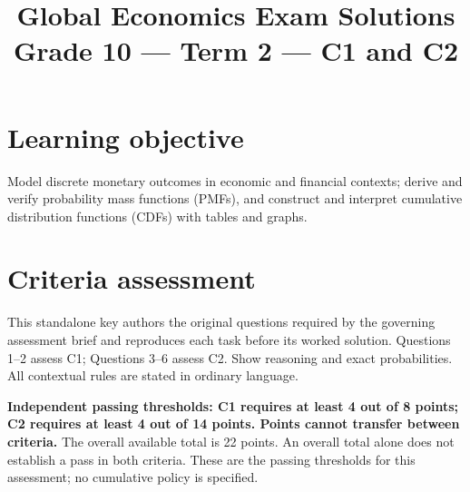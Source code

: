 \makeatletter
{}
\makeatother

\linespread{0.98}
\setlength{\parskip}{2pt}
\renewcommand{\arraystretch}{1.0}
\setlength{\emergencystretch}{2em}
\title{Global Economics Exam Solutions\\Grade 10 --- Term 2 --- C1 and C2}
\author{}
\date{}
\makeatletter
\renewcommand{\@maketitle}{\begin{center}{\Large\bfseries\@title\par}\end{center}}
\renewcommand\subsection{\@startsection{subsection}{2}{\z@}{-1.4ex plus -.3ex}{.7ex}{\normalfont\large\bfseries}}
\makeatother
{}

\maketitle
\small
\setcounter{tocdepth}{1}
\label{toc}
\tableofcontents
\section*{Learning objective}
Model discrete monetary outcomes in economic and financial contexts; derive and verify probability mass functions (PMFs), and construct and interpret cumulative distribution functions (CDFs) with tables and graphs.
\section*{Criteria assessment}
This standalone key authors the original questions required by the governing assessment brief and reproduces each task before its worked solution. Questions 1--2 assess C1; Questions 3--6 assess C2. Show reasoning and exact probabilities. All contextual rules are stated in ordinary language.

\textbf{Independent passing thresholds: C1 requires at least 4 out of 8 points; C2 requires at least 4 out of 14 points. Points cannot transfer between criteria.} The overall available total is 22 points. An overall total alone does not establish a pass in both criteria. These are the passing thresholds for this assessment; no cumulative policy is specified.
